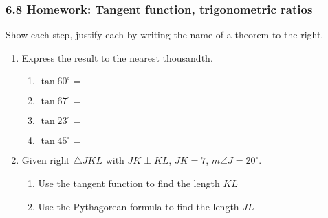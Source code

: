 \documentclass[12pt, oneside]{article}
\begin{document}
\subsubsection*{6.8 Homework: Tangent function, trigonometric ratios}
Show each step, justify each by writing the name of a theorem to the right.  \begin{enumerate}

    \item Express the result to the nearest thousandth.  \vspace{.5cm}
      \begin{multicols}{2}
        \begin{enumerate}
          \item $\tan 60^\circ = $ \vspace{1cm}
          \item $\tan 67^\circ =$
          \item $\tan 23^\circ = $ \vspace{1cm}
          \item $\tan 45^\circ =$
        \end{enumerate}
      \end{multicols} \vspace{1cm}

      \item Given right $\triangle JKL$ with $\overline{JK} \perp \overline{KL}$, $JK=7$, $m\angle J=20^\circ$.
      \begin{flushright}
         \vspace{1cm}
      \end{flushright}
      \begin{enumerate}
        \item Use the tangent function to find the length $KL$\\[3cm]
        \item Use the Pythagorean formula to find the length $JL$\\[3cm]


\end{enumerate}
\end{enumerate}
\end{document}
